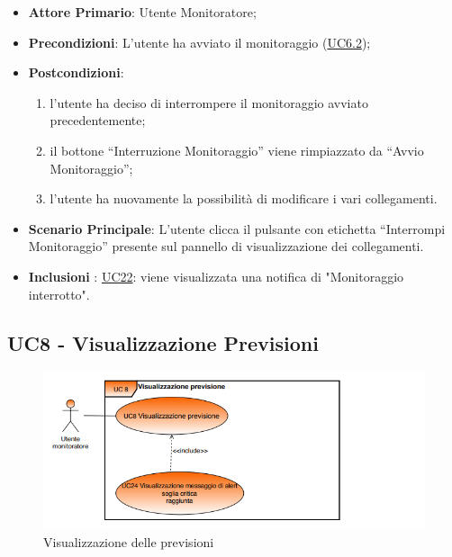		\begin{itemize}
			\item\textbf{Attore Primario}: Utente Monitoratore;
			\item\textbf{Precondizioni}: L’utente ha avviato il monitoraggio (\hyperref[par:UC6.2]{UC6.2});
			\item\textbf{Postcondizioni}:
				\begin{enumerate}
					\item l’utente ha deciso di interrompere il monitoraggio avviato precedentemente; 
					\item il bottone “Interruzione Monitoraggio” viene rimpiazzato da “Avvio Monitoraggio”;
					\item l’utente ha nuovamente la possibilità di modificare i vari collegamenti. 
				\end{enumerate}	
			\item\textbf{Scenario Principale}: L’utente clicca il pulsante con etichetta “Interrompi Monitoraggio” presente sul pannello di visualizzazione dei collegamenti.
			\item\textbf{Inclusioni }: \hyperref[par:UC22]{UC22}: viene visualizzata una notifica di "Monitoraggio interrotto".		
		\end{itemize}


	\label{par:UC8}
	\subsection{UC8 - Visualizzazione Previsioni}

	\begin{figure}[H]
		\centering
		\includegraphics[scale=0.80]{../Analisi_dei_requisiti/img/Diagrammi_UML/UC8_Visualizzazione_previsioni.png}
		\caption{Visualizzazione delle previsioni}
	\end{figure}

